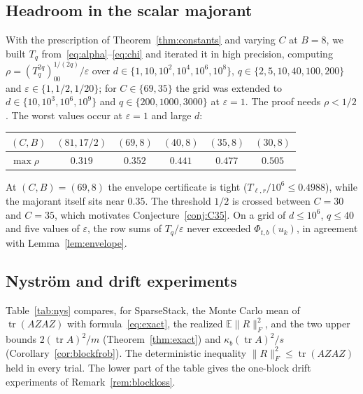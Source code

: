 \documentclass[11pt,a4paper]{article}
\theoremstyle{definition}
\theoremstyle{remark}
\newcommand{\E}{\mathbb E}
\newcommand{\tr}{\operatorname{tr}}
\newcommand{\eps}{\varepsilon}
\newcommand{\norm}[1]{\lVert#1\rVert}
\newcommand{\1}{\mathbf 1}
\begin{document}
\subsection{Headroom in the scalar majorant}\label{sec:num-majorant}
With the prescription of Theorem~\ref{thm:constants} and varying $C$
at $B=8$, we built $T_q$ from~\eqref{eq:alpha}--\eqref{eq:chi} and
iterated it in high precision, computing $\rho=(T_q^{2q})_{00}^{1/(2q)}/\eps$
over $d\in\{1,10,10^2,10^4,10^6,10^8\}$, $q\in\{2,5,10,40,100,200\}$ and
$\eps\in\{1,1/2,1/20\}$; for $C\in\{69,35\}$ the grid was extended to
$d\in\{10,10^3,10^6,10^9\}$ and $q\in\{200,1000,3000\}$ at $\eps=1$.
The proof needs $\rho<1/2$. The worst values
occur at $\eps=1$ and large $d$:
\begin{center}\small
\begin{tabular}{lccccc}
\toprule
$(C,B)$ & $(81,17/2)$ & $(69,8)$ & $(40,8)$ & $(35,8)$ & $(30,8)$\\
\midrule
$\max\rho$ & $0.319$ & $0.352$ & $0.441$ & $0.477$ & $0.505$\\
\bottomrule
\end{tabular}
\end{center}
At $(C,B)=(69,8)$ the envelope certificate is tight
($T_{\ell,r}/10^6\le0.4988$), while the majorant itself sits near $0.35$.
The threshold $1/2$ is crossed between $C=30$ and $C=35$, which motivates
Conjecture~\ref{conj:C35}. On a grid of $d\le10^6$, $q\le40$ and five
values of $\eps$, the row sums of $T_q/\eps$ never exceeded
$\Phi_{t,b}(u_k)$, in agreement with Lemma~\ref{lem:envelope}.

\subsection{Nystr\"om and drift experiments}\label{sec:num-nys}
Table~\ref{tab:nys} compares, for SparseStack, the Monte Carlo mean of
$\tr(AZAZ)$ with formula~\eqref{eq:exact}, the realized
$\E\norm R_F^2$, and the two upper bounds $2(\tr A)^2/m$
(Theorem~\ref{thm:exact}) and $\kappa_b(\tr A)^2/s$
(Corollary~\ref{cor:blockfrob}). The deterministic inequality
$\norm R_F^2\le\tr(AZAZ)$ held in every trial. The lower part of the
table gives the one-block drift experiments of
Remark~\ref{rem:blockloss}.
\end{document}
